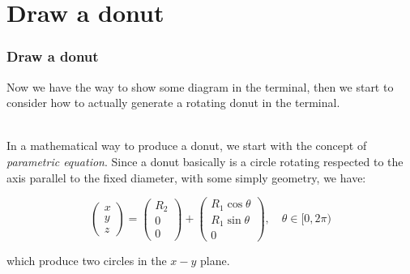 \documentclass[12pt, t]{beamer}
\renewcommand{\emph}[1]{{\color{Turquoise3}\textsl{#1}}}
\newcommand{\nullspace}{~\\[15pt]}
\begin{document}
\section{Draw a donut}
\begin{frame}
    \frametitle{Draw a donut}

    Now we have the way to show some diagram in the terminal, then we start to consider how to 
    actually generate a rotating donut in the terminal.

    \nullspace
    In a mathematical way to produce a donut, we start with the concept of \emph{parametric equation}.
    Since a donut basically is a circle rotating respected to the axis parallel to the fixed diameter,
    with some simply geometry, we have:

    \begin{equation*}
        \begin{pmatrix}
            x   \\
            y   \\
            z
        \end{pmatrix}
        =
        \begin{pmatrix}
            R_2 \\
            0   \\
            0
        \end{pmatrix}
        +
        \begin{pmatrix}
            R_1\cos{\theta} \\
            R_1\sin{\theta} \\
            0
        \end{pmatrix}
        ,\quad \theta \in [0,2\pi)
    \end{equation*}

    which produce two circles in the $x-y$ plane.

\end{frame}

\end{document}

